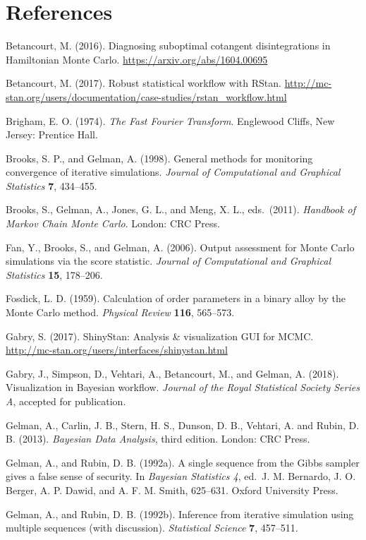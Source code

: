 \documentclass[11pt]{article}
\begin{document}
\section*{References}

\noindent

\bibitem Betancourt, M. (2016).  Diagnosing suboptimal cotangent disintegrations in Hamiltonian Monte Carlo. \url{https://arxiv.org/abs/1604.00695}

\bibitem Betancourt, M. (2017).  Robust statistical workflow with RStan.  \url{http://mc-stan.org/users/documentation/case-studies/rstan_workflow.html}

\bibitem Brigham, E. O. (1974). {\em The Fast Fourier Transform}.  Englewood Cliffs, New Jersey: Prentice Hall.

\bibitem Brooks, S. P., and Gelman, A. (1998).  General methods for monitoring convergence of iterative simulations.  {\em Journal of Computational and Graphical Statistics} {\bf 7}, 434--455.

\bibitem Brooks, S., Gelman, A., Jones, G. L., and Meng, X. L., eds.\ (2011).  {\em Handbook of Markov Chain Monte Carlo}.  London:  CRC Press.

\bibitem Fan, Y., Brooks, S., and Gelman, A. (2006).  Output assessment for Monte Carlo simulations via the score statistic. {\em Journal of Computational and Graphical Statistics} {\bf 15}, 178--206.

\bibitem Fosdick, L. D. (1959).  Calculation of order parameters in a binary alloy by the Monte Carlo method. {\em Physical Review} {\bf 116}, 565--573.

\bibitem Gabry, S. (2017).  ShinyStan:  Analysis \& visualization GUI for MCMC.  \url{http://mc-stan.org/users/interfaces/shinystan.html}

\bibitem Gabry, J., Simpson, D., Vehtari, A., Betancourt, M., and Gelman, A. (2018). Visualization in Bayesian workflow. {\em Journal of the Royal Statistical Society Series A}, accepted for publication.
  
\bibitem Gelman, A., Carlin, J. B., Stern, H. S., Dunson, D. B., Vehtari, A. and Rubin, D. B. (2013). {\em Bayesian Data Analysis}, third edition. London:  CRC Press.

\bibitem Gelman, A., and Rubin, D. B. (1992a).  A single sequence from the Gibbs sampler gives a false sense of security.
In {\em Bayesian Statistics 4}, ed.\ J. M. Bernardo, J. O. Berger, A. P. Dawid, and A. F. M. Smith, 625--631.  Oxford University Press.

\bibitem Gelman, A., and Rubin, D. B. (1992b).   Inference from iterative simulation using multiple sequences (with discussion).  {\em Statistical Science} {\bf 7}, 457--511.
\end{document}
